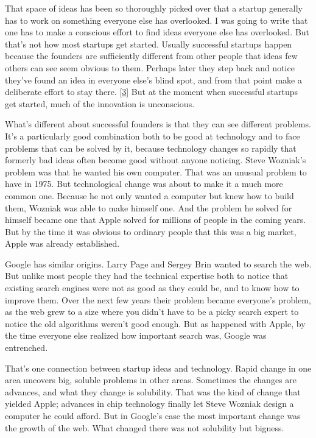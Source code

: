 That space of ideas has been so thoroughly picked over that a startup
generally has to work on something everyone else has overlooked.
I was going to write that one has to make a conscious effort to
find ideas everyone else has overlooked.  But that's not how most
startups get started.  Usually successful startups happen because
the founders are sufficiently different from other people that ideas
few others can see seem obvious to them.  Perhaps later they step
back and notice they've found an idea in everyone else's blind spot,
and from that point make a deliberate effort to stay there. 
[\href{\#f3n}{3}]
But at the moment when successful startups get started, much of the
innovation is unconscious.

What's different about successful founders is that they can see
different problems.  It's a particularly good combination both to
be good at technology and to face problems that can be solved by
it, because technology changes so rapidly that formerly bad ideas
often become good without anyone noticing.  Steve Wozniak's problem
was that he wanted his own computer.  That was an unusual problem
to have in 1975.  But technological change was about to make it a
much more common one.  Because he not only wanted a computer but
knew how to build them, Wozniak was able to make himself one.  And
the problem he solved for himself became one that Apple solved for
millions of people in the coming years.  But by the time it was
obvious to ordinary people that this was a big market, Apple was
already established.

Google has similar origins.  Larry Page and Sergey Brin wanted to
search the web.  But unlike most people they had the technical
expertise both to notice that existing search engines were not as
good as they could be, and to know how to improve them.  Over the
next few years their problem became everyone's problem, as the web
grew to a size where you didn't have to be a picky search expert
to notice the old algorithms weren't good enough.  But as happened
with Apple, by the time everyone else realized how important search
was, Google was entrenched.

That's one connection between startup ideas and technology.  Rapid
change in one area uncovers big, soluble problems in other areas.
Sometimes the changes are advances, and what they change is solubility.
That was the kind of change that yielded Apple; advances in chip
technology finally let Steve Wozniak design a computer he could
afford.  But in Google's case the most important change was the
growth of the web. What changed there was not solubility but bigness.


